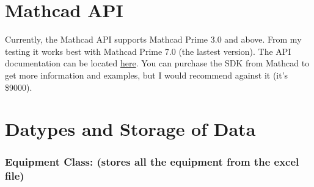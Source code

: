 \documentclass[11pt]{article}
\begin{document}
\section{Mathcad API}
\label{sec:org4f5c9da}
Currently, the Mathcad API supports Mathcad Prime 3.0 and above. From my testing it works best with Mathcad Prime 7.0 (the lastest version). The API documentation can be located \href{https://support.ptc.com/help/mathcad/r7.0/en/index.html\#page/PTC\_Mathcad\_Help\%2Fmathcad\_and\_automation\_api.html\%23}{here}. You can purchase the SDK from Mathcad to get more information and examples, but I would recommend against it (it's \$9000).
\section{Datypes and Storage of Data}
\label{sec:orgb97c4f5}
\subsubsection{Equipment Class: (stores all the equipment from the excel file)}
\label{sec:orgdd08703}
\end{document}
